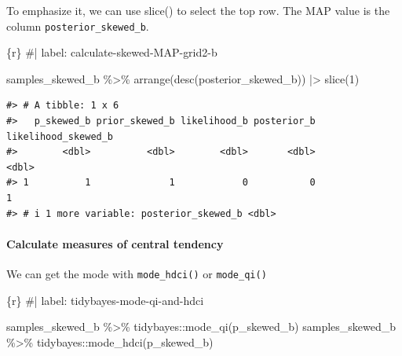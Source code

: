 \documentclass[
  letterpaper,
  DIV=11,
  numbers=noendperiod]{scrreprt}
\let\oldparagraph\paragraph
\renewcommand{\paragraph}[1]{\oldparagraph{#1}\mbox{}}
\newenvironment{Shaded}{\begin{snugshade}}{\end{snugshade}}
\newcommand{\CommentTok}[1]{\textcolor[rgb]{0.37,0.37,0.37}{#1}}
\newcommand{\DecValTok}[1]{\textcolor[rgb]{0.68,0.00,0.00}{#1}}
\newcommand{\FunctionTok}[1]{\textcolor[rgb]{0.28,0.35,0.67}{#1}}
\newcommand{\InformationTok}[1]{\textcolor[rgb]{0.37,0.37,0.37}{#1}}
\newcommand{\NormalTok}[1]{\textcolor[rgb]{0.00,0.23,0.31}{#1}}
\newcommand{\SpecialCharTok}[1]{\textcolor[rgb]{0.37,0.37,0.37}{#1}}
\begin{document}
To emphasize it, we can use slice() to select the top row. The MAP value
is the column \texttt{posterior\_skewed\_b}.

\begin{Shaded}
\begin{Highlighting}[]
\InformationTok{\textasciigrave{}\textasciigrave{}\textasciigrave{}\{r\}}
\CommentTok{\#| label: calculate{-}skewed{-}MAP{-}grid2{-}b}

\NormalTok{samples\_skewed\_b }\SpecialCharTok{\%\textgreater{}\%} 
  \FunctionTok{arrange}\NormalTok{(}\FunctionTok{desc}\NormalTok{(posterior\_skewed\_b)) }\SpecialCharTok{|\textgreater{}} 
  \FunctionTok{slice}\NormalTok{(}\DecValTok{1}\NormalTok{)}
\InformationTok{\textasciigrave{}\textasciigrave{}\textasciigrave{}}
\end{Highlighting}
\end{Shaded}

\begin{verbatim}
#> # A tibble: 1 x 6
#>   p_skewed_b prior_skewed_b likelihood_b posterior_b likelihood_skewed_b
#>        <dbl>          <dbl>        <dbl>       <dbl>               <dbl>
#> 1          1              1            0           0                   1
#> # i 1 more variable: posterior_skewed_b <dbl>
\end{verbatim}

\hypertarget{calculate-measures-of-central-tendency-1}{%
\paragraph{Calculate measures of central
tendency}\label{calculate-measures-of-central-tendency-1}}

We can get the mode with \texttt{mode\_hdci()} or \texttt{mode\_qi()}

\begin{Shaded}
\begin{Highlighting}[]
\InformationTok{\textasciigrave{}\textasciigrave{}\textasciigrave{}\{r\}}
\CommentTok{\#| label: tidybayes{-}mode{-}qi{-}and{-}hdci}

\NormalTok{samples\_skewed\_b }\SpecialCharTok{\%\textgreater{}\%}\NormalTok{ tidybayes}\SpecialCharTok{::}\FunctionTok{mode\_qi}\NormalTok{(p\_skewed\_b)}
\NormalTok{samples\_skewed\_b }\SpecialCharTok{\%\textgreater{}\%}\NormalTok{ tidybayes}\SpecialCharTok{::}\FunctionTok{mode\_hdci}\NormalTok{(p\_skewed\_b)}
\InformationTok{\textasciigrave{}\textasciigrave{}\textasciigrave{}}
\end{Highlighting}
\end{Shaded}
\end{document}
